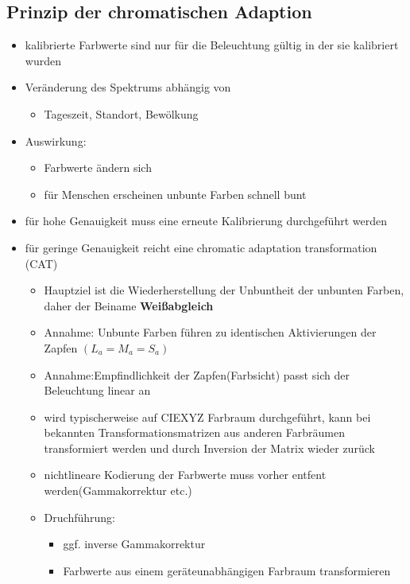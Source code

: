 \documentclass[11pt]{article}
\begin{document}
\subsection{Prinzip der chromatischen Adaption}
\begin{itemize}
    \item kalibrierte Farbwerte sind nur für die Beleuchtung gültig in der sie kalibriert wurden
        \item Veränderung des Spektrums abhängig von
        \begin{itemize}
            \item Tageszeit, Standort, Bewölkung
        \end{itemize}
        \item Auswirkung:
        \begin{itemize}
            \item Farbwerte ändern sich
            \item für Menschen erscheinen unbunte Farben schnell bunt
        \end{itemize}
        \item für hohe Genauigkeit muss eine erneute Kalibrierung durchgeführt werden
        \item für geringe Genauigkeit reicht eine chromatic adaptation transformation (CAT)
        \begin{itemize}
            \item Hauptziel ist die Wiederherstellung der Unbuntheit der unbunten Farben, daher der Beiname \textbf{Weißabgleich}
            \item Annahme: Unbunte Farben führen zu identischen Aktivierungen der Zapfen $(L_a = M_a = S_a)$
            \item Annahme:Empfindlichkeit der Zapfen(Farbsicht) passt sich der Beleuchtung linear an
            \item wird typischerweise auf CIEXYZ Farbraum durchgeführt, kann bei bekannten Transformationsmatrizen aus anderen Farbräumen transformiert werden und durch Inversion der Matrix wieder zurück
            \item nichtlineare Kodierung der Farbwerte muss vorher entfent werden(Gammakorrektur etc.)
            \item Druchführung:
            \begin{itemize}
                \item ggf. inverse Gammakorrektur
                \item Farbwerte aus einem geräteunabhängigen Farbraum transformieren

\end{itemize}
\end{itemize}
\end{itemize}
\end{document}
